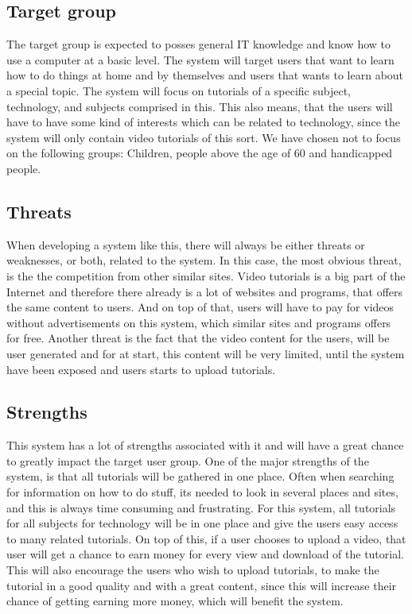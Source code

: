 \subsection{Target group}
The target group is expected to posses general IT knowledge and know how to use a computer at a basic level. The system will target users that want to learn how to do things at home and by themselves and users that wants to learn about a special topic. The system will focus on tutorials of a specific subject, technology, and subjects comprised in this. This also means, that the users will have to have some kind of interests which can be related to technology, since the system will only contain video tutorials of this sort.
We have chosen not to focus on the following groups: Children, people above the age of 60 and handicapped people.

\subsection{Threats}
When developing a system like this, there will always be either threats or weaknesses, or both, related to the system. In this case, the most obvious threat, is the the competition from other similar sites. Video tutorials is a big part of the Internet and therefore there already is a lot of websites and programs, that offers the same content to users. And on top of that, users will have to pay for videos without advertisements on this system, which similar sites and programs offers for free. Another threat is the fact that the video content for the users, will be user generated and for at start, this content will be very limited, until the system have been exposed and users starts to upload tutorials.

\subsection{Strengths}
This system has a lot of strengths associated with it and will have a great chance to greatly impact the target user group. One of the major strengths of the system, is that all tutorials will be gathered in one place. Often when searching for information on how to do stuff, its needed to look in several places and sites, and this is always time consuming and frustrating. For this system, all tutorials for all subjects for technology will be in one place and give the users easy access to many related tutorials. On top of this, if a user chooses to upload a video, that user will get a chance to earn money for every view and download of the tutorial. This will also encourage the users who wish to upload tutorials, to make the tutorial in a good quality and with a great content, since this will increase their chance of getting earning more money, which will benefit the system.


